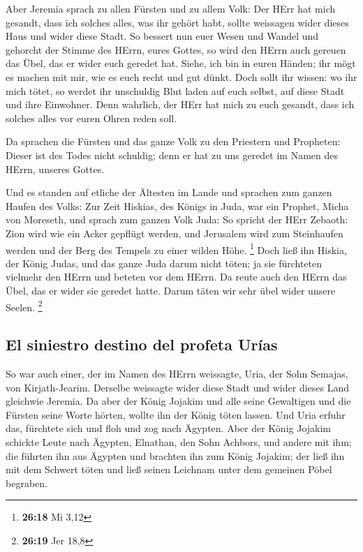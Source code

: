  Aber Jeremia sprach zu allen Fürsten und zu allem Volk:
Der HErr hat mich gesandt, dass ich solches alles, was ihr gehört habt,
sollte weissagen wider dieses Haus und wider diese Stadt.
 So bessert nun euer Wesen und Wandel und gehorcht der
Stimme des HErrn, eures Gottes, so wird den HErrn auch gereuen das Übel,
das er wider euch geredet hat.  Siehe, ich bin in euren
Händen; ihr mögt es machen mit mir, wie es euch recht und gut dünkt.
 Doch sollt ihr wissen: wo ihr mich tötet, so werdet ihr
unschuldig Blut laden auf euch selbst, auf diese Stadt und ihre
Einwohner. Denn wahrlich, der HErr hat mich zu euch gesandt, dass ich
solches alles vor euren Ohren reden soll.

 Da sprachen die Fürsten und das ganze Volk zu den
Priestern und Propheten: Dieser ist des Todes nicht schuldig; denn er
hat zu uns geredet im Namen des HErrn, unseres Gottes.

 Und es standen auf etliche der Ältesten im Lande und
sprachen zum ganzen Haufen des Volks:  Zur Zeit Hiskias,
des Königs in Juda, war ein Prophet, Micha von Moreseth, und sprach zum
ganzen Volk Juda: So spricht der HErr Zebaoth: Zion wird wie ein Acker
gepflügt werden, und Jerusalem wird zum Steinhaufen werden und der Berg
des Tempels zu einer wilden Höhe. \footnote{\textbf{26:18} Mi 3,12}
 Doch ließ ihn Hiskia, der König Judas, und das ganze
Juda darum nicht töten; ja sie fürchteten vielmehr den HErrn und beteten
vor dem HErrn. Da reute auch den HErrn das Übel, das er wider sie
geredet hatte. Darum täten wir sehr übel wider unsere Seelen.
\footnote{\textbf{26:19} Jer 18,8}

\hypertarget{el-siniestro-destino-del-profeta-uruxedas}{%
\subsection{El siniestro destino del profeta
Urías}\label{el-siniestro-destino-del-profeta-uruxedas}}

 So war auch einer, der im Namen des HErrn weissagte,
Uria, der Sohn Semajas, von Kirjath-Jearim. Derselbe weissagte wider
diese Stadt und wider dieses Land gleichwie Jeremia.  Da
aber der König Jojakim und alle seine Gewaltigen und die Fürsten seine
Worte hörten, wollte ihn der König töten lassen. Und Uria erfuhr das,
fürchtete sich und floh und zog nach Ägypten.  Aber der
König Jojakim schickte Leute nach Ägypten, Elnathan, den Sohn Achbors,
und andere mit ihm;  die führten ihn aus Ägypten und
brachten ihn zum König Jojakim; der ließ ihn mit dem Schwert töten und
ließ seinen Leichnam unter dem gemeinen Pöbel begraben.

